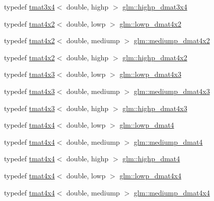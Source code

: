 \begin{DoxyCompactItemize}
\item 
typedef \hyperlink{structglm_1_1tmat3x4}{tmat3x4}$<$ double, highp $>$ \hyperlink{group__core__precision_ga2f3cf8e3bd4ea0beeefe56b45b14118b}{glm\+::highp\+\_\+dmat3x4}
\item 
typedef \hyperlink{structglm_1_1tmat4x2}{tmat4x2}$<$ double, lowp $>$ \hyperlink{group__core__precision_gaeee03c38861981ecb29f3f71644bf3ac}{glm\+::lowp\+\_\+dmat4x2}
\item 
typedef \hyperlink{structglm_1_1tmat4x2}{tmat4x2}$<$ double, mediump $>$ \hyperlink{group__core__precision_gaee918464c0be014e744ff38f37c18585}{glm\+::mediump\+\_\+dmat4x2}
\item 
typedef \hyperlink{structglm_1_1tmat4x2}{tmat4x2}$<$ double, highp $>$ \hyperlink{group__core__precision_gaa0a2369be2e3d5a4db98cae345413dc1}{glm\+::highp\+\_\+dmat4x2}
\item 
typedef \hyperlink{structglm_1_1tmat4x3}{tmat4x3}$<$ double, lowp $>$ \hyperlink{group__core__precision_gac445c564f0c68d3520eca97ea755e618}{glm\+::lowp\+\_\+dmat4x3}
\item 
typedef \hyperlink{structglm_1_1tmat4x3}{tmat4x3}$<$ double, mediump $>$ \hyperlink{group__core__precision_ga9870d3f13ee4601a8abf75f6b54440b9}{glm\+::mediump\+\_\+dmat4x3}
\item 
typedef \hyperlink{structglm_1_1tmat4x3}{tmat4x3}$<$ double, highp $>$ \hyperlink{group__core__precision_gaec00d802f271a807485a0069cdb5ea05}{glm\+::highp\+\_\+dmat4x3}
\item 
typedef \hyperlink{structglm_1_1tmat4x4}{tmat4x4}$<$ double, lowp $>$ \hyperlink{group__core__precision_gafb95042ba1765add225ae138437f860e}{glm\+::lowp\+\_\+dmat4}
\item 
typedef \hyperlink{structglm_1_1tmat4x4}{tmat4x4}$<$ double, mediump $>$ \hyperlink{group__core__precision_ga434a0c62564f19f260ed0520995e90f3}{glm\+::mediump\+\_\+dmat4}
\item 
typedef \hyperlink{structglm_1_1tmat4x4}{tmat4x4}$<$ double, highp $>$ \hyperlink{group__core__precision_ga457246aa7c671b1ed3dce700b3c1d4c0}{glm\+::highp\+\_\+dmat4}
\item 
typedef \hyperlink{structglm_1_1tmat4x4}{tmat4x4}$<$ double, lowp $>$ \hyperlink{group__core__precision_gad9168c20a21d1bfeb0f5d2ddfb98f519}{glm\+::lowp\+\_\+dmat4x4}
\item 
typedef \hyperlink{structglm_1_1tmat4x4}{tmat4x4}$<$ double, mediump $>$ \hyperlink{group__core__precision_ga6dc4057e30931ebd0b5d7e44ef27763a}{glm\+::mediump\+\_\+dmat4x4}
\item 

\end{DoxyCompactItemize}
